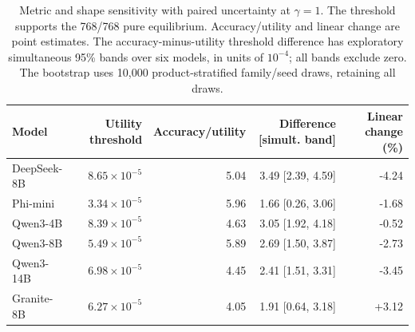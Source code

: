 \begin{table}[htbp]
\centering\small
\caption{Metric and shape sensitivity with paired uncertainty at $\gamma=1$. The threshold supports the 768/768 pure equilibrium. Accuracy/utility and linear change are point estimates. The accuracy-minus-utility threshold difference has exploratory simultaneous 95\% bands over six models, in units of $10^{-4}$; all bands exclude zero. The bootstrap uses 10,000 product-stratified family/seed draws, retaining all draws.}
\label{tab:metricshapecomparison}
\setlength{\tabcolsep}{4pt}
\begin{tabular}{lrrrr}
\toprule
Model & Utility threshold & Accuracy/utility & Difference [simult. band] & Linear change (\%) \\
\midrule
DeepSeek-8B & $8.65\times10^{-5}$ & 5.04 & 3.49 [2.39, 4.59] & -4.24 \\
Phi-mini & $3.34\times10^{-5}$ & 5.96 & 1.66 [0.26, 3.06] & -1.68 \\
Qwen3-4B & $8.39\times10^{-5}$ & 4.63 & 3.05 [1.92, 4.18] & -0.52 \\
Qwen3-8B & $5.49\times10^{-5}$ & 5.89 & 2.69 [1.50, 3.87] & -2.73 \\
Qwen3-14B & $6.98\times10^{-5}$ & 4.45 & 2.41 [1.51, 3.31] & -3.45 \\
Granite-8B & $6.27\times10^{-5}$ & 4.05 & 1.91 [0.64, 3.18] & +3.12 \\
\bottomrule
\end{tabular}
\end{table}
